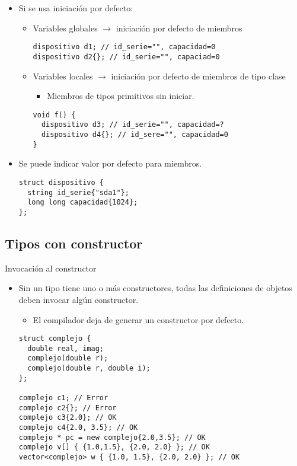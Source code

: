 \begin{frame}[fragile]
\begin{itemize}
  \item Si se usa iniciación por defecto:
    \begin{itemize}
      \item Variables globales $\rightarrow$ iniciación por defecto de miembros
\begin{lstlisting}
dispositivo d1; // id_serie="", capacidad=0
dispositivo d2{}; // id_serie="", capaciad=0
\end{lstlisting}
      \item Variables locales $\rightarrow$ iniciación por defecto de miembros de tipo clase
        \begin{itemize}
          \item Miembros de tipos primitivos sin iniciar.
        \end{itemize}
\begin{lstlisting}
void f() {
  dispositivo d3; // id_serie="", capacidad=?
  dispositivo d4{}; // id_sere="", capacidad=0
}
\end{lstlisting}
    \end{itemize}
  \item Se puede indicar valor por defecto para miembros.
\begin{lstlisting}
struct dispositivo {
  string id_serie{"sda1"};
  long long capacidad{1024};
};
\end{lstlisting}
\end{itemize}
\end{frame}

\subsection{Tipos con constructor}

\begin{frame}[fragile]{Invocación al constructor}
\begin{itemize}
  \item Sin un tipo tiene uno o más constructores, todas las definiciones de objetos 
        deben invocar algún constructor.
    \begin{itemize}
      \item El compilador deja de generar un constructor por defecto.
    \end{itemize}
\begin{lstlisting}
struct complejo {
  double real, imag;
  complejo(double r);
  complejo(double r, double i);
};

complejo c1; // Error
complejo c2{}; // Error
complejo c3{2.0}; // OK
complejo c4{2.0, 3.5}; // OK
complejo * pc = new complejo{2.0,3.5}; // OK
complejo v[] { {1.0,1.5}, {2.0, 2.0} }; // OK
vector<complejo> w { {1.0, 1.5}, {2.0, 2.0} }; // OK
\end{lstlisting}
\end{itemize}
\end{frame}

